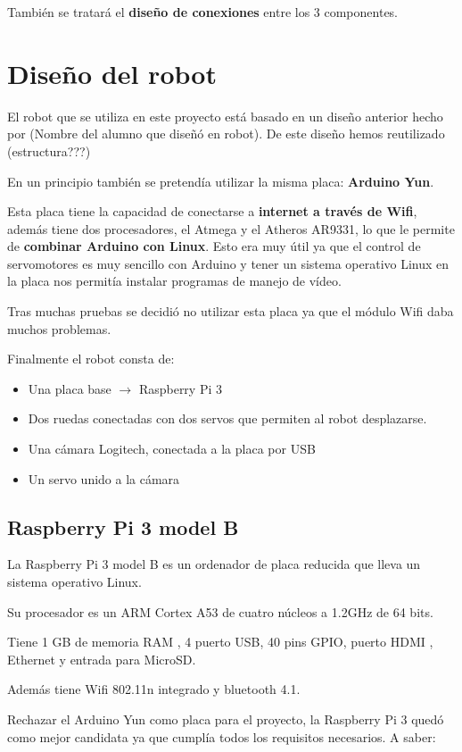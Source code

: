 \documentclass[twoside, 12pt]{epstfg}
\begin{document}
También se tratará el \textbf{diseño de conexiones} entre los 3 componentes.

\section{Diseño del robot}

El robot que se utiliza en este proyecto está basado en un diseño anterior hecho por (Nombre del alumno que diseñó en robot). De este diseño hemos reutilizado (estructura???)

En un principio también se pretendía utilizar la misma placa: \textbf{Arduino Yun}.

Esta placa tiene la capacidad de conectarse a \textbf{internet a través de Wifi}, además tiene dos procesadores, el Atmega y el Atheros AR9331, lo que le permite de \textbf{combinar Arduino con Linux}. Esto era muy útil ya que el control de servomotores es muy sencillo con Arduino y tener un sistema operativo Linux en la placa nos permitía instalar programas de manejo de vídeo.

Tras muchas pruebas se decidió no utilizar esta placa ya que el módulo Wifi daba muchos problemas.

Finalmente el robot consta de:
\begin{itemize}
	\item Una placa base $\rightarrow$ Raspberry Pi 3
	\item Dos ruedas conectadas con dos servos que permiten al robot desplazarse.
	\item Una cámara Logitech, conectada a la placa por USB
	\item Un servo unido a la cámara 
\end{itemize}




\subsection{Raspberry Pi 3 model B}
La Raspberry Pi 3 model B es un ordenador de placa reducida que lleva un sistema operativo Linux.

Su procesador es un ARM Cortex A53 de cuatro núcleos a 1.2GHz de 64 bits.

Tiene 1 GB de memoria RAM , 4 puerto USB, 40 pins GPIO, puerto HDMI , Ethernet y entrada para MicroSD.

Además tiene Wifi 802.11n integrado y bluetooth 4.1.

Rechazar el Arduino Yun como placa para el proyecto, la Raspberry Pi 3 quedó como mejor candidata ya que cumplía todos los requisitos necesarios. A saber:
\end{document}
